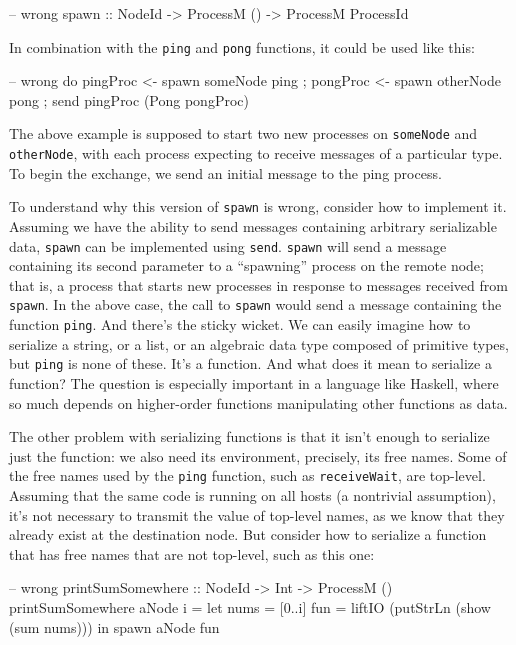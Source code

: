 \documentclass[preprint]{sigplanconf}
\begin{document}
\begin{code}
-- wrong
spawn :: NodeId -> ProcessM () -> ProcessM ProcessId
\end{code}

In combination with the \texttt{ping} and \texttt{pong} functions, it could be used like this:

\begin{code}
-- wrong
do { pingProc <- spawn someNode ping
   ; pongProc <- spawn otherNode pong
   ; send pingProc (Pong pongProc) }
\end{code}

The above example is supposed to start two new processes on \texttt{someNode} and \texttt{otherNode}, with each process expecting to receive messages of a particular type. To begin the exchange, we send an initial message to the ping process.

To understand why this version of \texttt{spawn} is wrong, consider how to implement it. Assuming we have the ability to send messages containing arbitrary serializable data, \texttt{spawn} can be implemented using \texttt{send}.  \texttt{spawn} will send a message containing its second parameter to a ``spawning'' process on the remote node; that is, a process that starts new processes in response to messages received from \texttt{spawn}. In the above case, the call to \texttt{spawn} would send a message containing the function \texttt{ping}. And there's the sticky wicket. We can easily imagine how to serialize a string, or a list, or an algebraic data type composed of primitive types, but \texttt{ping} is none of these. It's a function. And what does it mean to serialize a function? The question is especially important in a language like Haskell, where so much depends on higher-order functions manipulating other functions as data.

The other problem with serializing functions is that it isn't enough to serialize just the function: we also need its environment, precisely, its free names. Some of the free names used by the \texttt{ping} function, such as \texttt{receiveWait}, are top-level. Assuming that the same code is running on all hosts (a nontrivial assumption), it's not necessary to transmit the value of top-level names, as we know that they already exist at the destination node. But consider how to serialize a function that has free names that are not top-level, such as this one:

\begin{code}
-- wrong
printSumSomewhere :: NodeId -> Int -> ProcessM ()
printSumSomewhere aNode i =
  let nums = [0..i]
      fun = liftIO (putStrLn (show (sum nums)))
   in spawn aNode fun
\end{code}
\end{document}
